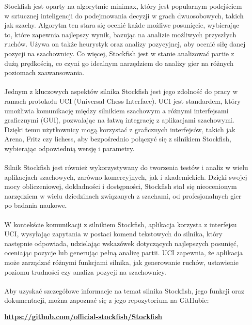 \documentclass[12pt,a4paper]{article}
\begin{document}
\noindent
Stockfish jest oparty na algorytmie minimax, który jest popularnym podejściem w sztucznej inteligencji do podejmowania decyzji w grach dwuosobowych, takich jak szachy. Algorytm ten stara się ocenić każde możliwe posunięcie, wybierając to, które zapewnia najlepszy wynik, bazując na analizie możliwych przyszłych ruchów. Używa on także heurystyk oraz analizy pozycyjnej, aby ocenić siłę danej pozycji na szachownicy. Co więcej, Stockfish jest w stanie analizować partie z dużą prędkością, co czyni go idealnym narzędziem do analizy gier na różnych poziomach zaawansowania.
\\\\
Jednym z kluczowych aspektów silnika Stockfish jest jego zdolność do pracy w ramach protokołu UCI (Universal Chess Interface). UCI jest standardem, który umożliwia komunikację między silnikiem szachowym a różnymi interfejsami graficznymi (GUI), pozwalając na łatwą integrację z aplikacjami szachowymi. Dzięki temu użytkownicy mogą korzystać z graficznych interfejsów, takich jak Arena, Fritz czy lichess, aby bezpośrednio połączyć się z silnikiem Stockfish, wybierając odpowiednią wersję i parametry.
\\\\
Silnik Stockfish jest również wykorzystywany do tworzenia testów i analiz w wielu aplikacjach szachowych, zarówno komercyjnych, jak i akademickich. Dzięki swojej mocy obliczeniowej, dokładności i dostępności, Stockfish stał się nieocenionym narzędziem w wielu dziedzinach związanych z szachami, od profesjonalnych gier po badania naukowe.
\\\\
W kontekście komunikacji z silnikiem Stockfish, aplikacja korzysta z interfejsu UCI, wysyłając zapytania w postaci komend tekstowych do silnika, który następnie odpowiada, udzielając wskazówek dotyczących najlepszych posunięć, oceniając pozycje lub generując pełną analizę partii. UCI zapewnia, że aplikacja może zarządzać różnymi funkcjami silnika, jak generowanie ruchów, ustawienie poziomu trudności czy analiza pozycji na szachownicy.
\\\\
Aby uzyskać szczegółowe informacje na temat silnika Stockfish, jego funkcji oraz dokumentacji, można zapoznać się z jego repozytorium na GitHubie: 

\begin{center}
    \textbf{\href{https://github.com/official-stockfish/Stockfish}{https://github.com/official-stockfish/Stockfish}}
\end{center}
\end{document}
